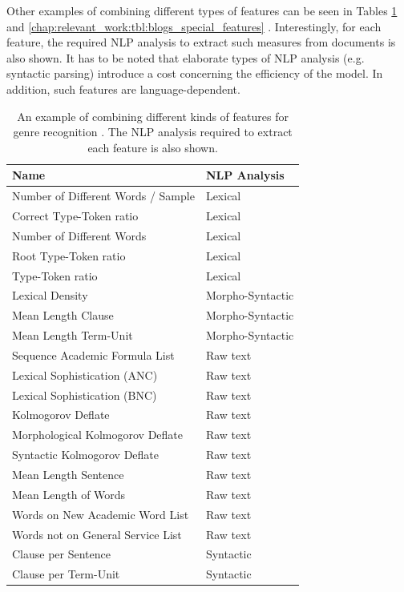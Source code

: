 Other examples of combining different types of features can be seen in Tables \ref{chap:relevant_work:tbl:complexity_measures} and \ref{chap:relevant_work:tbl:blogs_special_features} \parencite{strobel2018text,virik2017blog}. Interestingly, for each feature, the required NLP analysis to extract such measures from documents is also shown. It has to be noted that elaborate types of NLP analysis (e.g. syntactic parsing) introduce a cost concerning the efficiency of the model. In addition, such features are language-dependent.

\begin{table}[t]
	\center
	\caption {An example of combining different kinds of features for genre recognition \parencite{strobel2018text}. The NLP analysis required to extract each feature is also shown.}
	\label{chap:relevant_work:tbl:complexity_measures}
	\begin{tabular}{ll}
		\hline
		Name & NLP Analysis \\
		\hline
		Number of Different Words / Sample & Lexical \\
		Correct Type-Token ratio & Lexical \\
		Number of Different Words & Lexical \\
		Root Type-Token ratio & Lexical \\
		Type-Token ratio & Lexical \\
		Lexical Density & Morpho-Syntactic \\
		Mean Length Clause & Morpho-Syntactic \\
		Mean Length Term-Unit & Morpho-Syntactic \\
		Sequence Academic Formula List & Raw text \\
		Lexical Sophistication (ANC) & Raw text \\
		Lexical Sophistication (BNC) & Raw text \\
		Kolmogorov Deflate & Raw text \\
		Morphological Kolmogorov Deflate & Raw text \\
		Syntactic Kolmogorov Deflate & Raw text \\
		Mean Length Sentence & Raw text \\
		Mean Length of Words & Raw text \\
		Words on New Academic Word List & Raw text \\
		Words not on General Service List & Raw text \\
		Clause per Sentence & Syntactic \\
		Clause per Term-Unit & Syntactic \\

\end{tabular}
\end{table}
